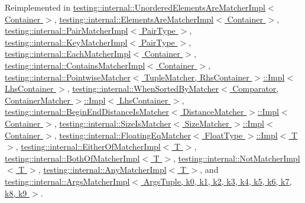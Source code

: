Reimplemented in \hyperlink{classtesting_1_1internal_1_1_unordered_elements_are_matcher_impl_af82233b636acbf0e195ede20cd6103f0}{testing\+::internal\+::\+Unordered\+Elements\+Are\+Matcher\+Impl$<$ Container $>$}, \hyperlink{classtesting_1_1internal_1_1_elements_are_matcher_impl_a444dc46c3c78f6c4c9e45544c6dee95d}{testing\+::internal\+::\+Elements\+Are\+Matcher\+Impl$<$ Container $>$}, \hyperlink{classtesting_1_1internal_1_1_pair_matcher_impl_a922aa4076ef4e2f1a2d2b4ae30d8be7c}{testing\+::internal\+::\+Pair\+Matcher\+Impl$<$ Pair\+Type $>$}, \hyperlink{classtesting_1_1internal_1_1_key_matcher_impl_a45429cc899ff43b268aad48aa3ed0b12}{testing\+::internal\+::\+Key\+Matcher\+Impl$<$ Pair\+Type $>$}, \hyperlink{classtesting_1_1internal_1_1_each_matcher_impl_a52941ed863914b8fd2dba5c229b57f30}{testing\+::internal\+::\+Each\+Matcher\+Impl$<$ Container $>$}, \hyperlink{classtesting_1_1internal_1_1_contains_matcher_impl_aa8448326064567a1c61ef027a241459c}{testing\+::internal\+::\+Contains\+Matcher\+Impl$<$ Container $>$}, \hyperlink{classtesting_1_1internal_1_1_pointwise_matcher_1_1_impl_a2098bacac67c13d29709d357033e2d3a}{testing\+::internal\+::\+Pointwise\+Matcher$<$ Tuple\+Matcher, Rhs\+Container $>$\+::\+Impl$<$ Lhs\+Container $>$}, \hyperlink{classtesting_1_1internal_1_1_when_sorted_by_matcher_1_1_impl_af484d525e5dc6c3ba48c57f0c3696b54}{testing\+::internal\+::\+When\+Sorted\+By\+Matcher$<$ Comparator, Container\+Matcher $>$\+::\+Impl$<$ Lhs\+Container $>$}, \hyperlink{classtesting_1_1internal_1_1_begin_end_distance_is_matcher_1_1_impl_a7e2a6ddef3dd17a343b8dca9ec93adb7}{testing\+::internal\+::\+Begin\+End\+Distance\+Is\+Matcher$<$ Distance\+Matcher $>$\+::\+Impl$<$ Container $>$}, \hyperlink{classtesting_1_1internal_1_1_size_is_matcher_1_1_impl_adb77690cb058ea5e2f56bb1ddcba0289}{testing\+::internal\+::\+Size\+Is\+Matcher$<$ Size\+Matcher $>$\+::\+Impl$<$ Container $>$}, \hyperlink{classtesting_1_1internal_1_1_floating_eq_matcher_1_1_impl_ab8799175394f311082142850717dabd0}{testing\+::internal\+::\+Floating\+Eq\+Matcher$<$ Float\+Type $>$\+::\+Impl$<$ T $>$}, \hyperlink{classtesting_1_1internal_1_1_either_of_matcher_impl_aba8090d2131a07bb7dcb91e7e2602366}{testing\+::internal\+::\+Either\+Of\+Matcher\+Impl$<$ T $>$}, \hyperlink{classtesting_1_1internal_1_1_both_of_matcher_impl_a4db4b4119cc2b742e5139922d56e514c}{testing\+::internal\+::\+Both\+Of\+Matcher\+Impl$<$ T $>$}, \hyperlink{classtesting_1_1internal_1_1_not_matcher_impl_ad0b7d4123d3106824c83b916fc577f78}{testing\+::internal\+::\+Not\+Matcher\+Impl$<$ T $>$}, \hyperlink{classtesting_1_1internal_1_1_any_matcher_impl_ae403b0e2cf75db076e3465c579a2175b}{testing\+::internal\+::\+Any\+Matcher\+Impl$<$ T $>$}, and \hyperlink{classtesting_1_1internal_1_1_args_matcher_impl_af22ab8bcd4baee6d1c79751d46240289}{testing\+::internal\+::\+Args\+Matcher\+Impl$<$ Args\+Tuple, k0, k1, k2, k3, k4, k5, k6, k7, k8, k9 $>$}.

